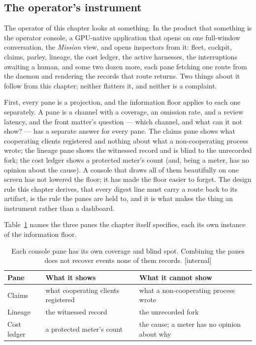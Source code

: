 \documentclass[11pt,a4paper]{article}
\theoremstyle{definition}
\theoremstyle{plain}
\begin{document}
\subsection{The operator's instrument}\label{sec:operator-instrument}

The operator of this chapter looks at something. In the product that
something is the operator console, a GPU-native application that opens on
one full-window conversation, the \emph{Mission} view, and opens inspectors
from it: fleet, cockpit, claims, parley, lineage, the cost ledger, the active
harnesses, the interruptions awaiting a human, and some two dozen more, each
pane fetching one route from the daemon and rendering the records that route
returns. Two things about it follow from this chapter; neither flatters it,
and neither is a complaint.

First, every pane is a projection, and the information floor applies to each
one separately. A pane is a channel with a coverage, an omission rate, and a
review latency, and the front matter's question --- which channel, and what
can it not show? --- has a separate answer for every pane. The claims pane
shows what cooperating clients registered and nothing about what a
non-cooperating process wrote; the lineage pane shows the witnessed record
and is blind to the unrecorded fork; the cost ledger shows a protected
meter's count (and, being a meter, has no opinion about the cause). A console
that draws all of them beautifully on one screen has not lowered the floor;
it has made the floor easier to forget. The design rule this chapter derives,
that every digest line must carry a route back to its artifact, is the rule
the panes are held to, and it is what makes the thing an instrument rather
than a dashboard.


Table~\ref{tab:pane-floors} names the three panes the chapter itself
specifies, each its own instance of the information floor.

\begin{table}[H]
\centering
\small
\renewcommand{\arraystretch}{1.25}
\setlength{\tabcolsep}{4pt}
\begin{tabularx}{\textwidth}{@{}>{\raggedright\arraybackslash}p{} >{\raggedright\arraybackslash}X >{\raggedright\arraybackslash}X@{}}
\toprule
\textbf{Pane} & \textbf{What it shows} & \textbf{What it cannot show} \\
\midrule
Claims & what cooperating clients registered & what a non-cooperating process wrote \\
Lineage & the witnessed record & the unrecorded fork \\
Cost ledger & a protected meter's count & the cause; a meter has no opinion about why \\
\bottomrule
\end{tabularx}
\caption{Each console pane has its own coverage and blind spot. Combining
the panes does not recover events none of them records. [internal]}
\label{tab:pane-floors}
\end{table}
\end{document}
